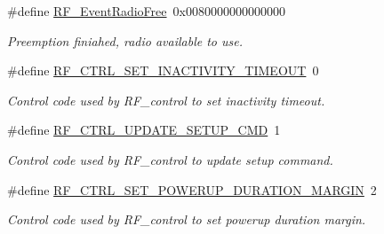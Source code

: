 \begin{DoxyCompactItemize}
\#define \hyperlink{group___r_f___driver___events_ga9742a8b624a11e7033f3c7ec4c283797}{R\+F\+\_\+\+Event\+Radio\+Free}~0x0080000000000000
\begin{DoxyCompactList}\small\item\em Preemption finiahed, radio available to use. \end{DoxyCompactList}\item 
\#define \hyperlink{group___r_f___c_t_r_l_ga24096530a8da4bde84275bc9c76b2cee}{R\+F\+\_\+\+C\+T\+R\+L\+\_\+\+S\+E\+T\+\_\+\+I\+N\+A\+C\+T\+I\+V\+I\+T\+Y\+\_\+\+T\+I\+M\+E\+O\+U\+T}~0
\begin{DoxyCompactList}\small\item\em Control code used by R\+F\+\_\+control to set inactivity timeout. \end{DoxyCompactList}\item 
\#define \hyperlink{group___r_f___c_t_r_l_ga74d367afdca187785b17c59b31d1e89a}{R\+F\+\_\+\+C\+T\+R\+L\+\_\+\+U\+P\+D\+A\+T\+E\+\_\+\+S\+E\+T\+U\+P\+\_\+\+C\+M\+D}~1
\begin{DoxyCompactList}\small\item\em Control code used by R\+F\+\_\+control to update setup command. \end{DoxyCompactList}\item 
\#define \hyperlink{group___r_f___c_t_r_l_ga32bd63d8617c2fde41bbc30d1e8f0db5}{R\+F\+\_\+\+C\+T\+R\+L\+\_\+\+S\+E\+T\+\_\+\+P\+O\+W\+E\+R\+U\+P\+\_\+\+D\+U\+R\+A\+T\+I\+O\+N\+\_\+\+M\+A\+R\+G\+I\+N}~2
\begin{DoxyCompactList}\small\item\em Control code used by R\+F\+\_\+control to set powerup duration margin. \end{DoxyCompactList}\end{DoxyCompactItemize}
{\bf }\par
